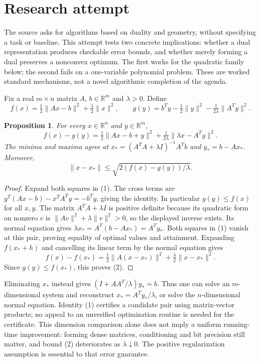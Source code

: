 \documentclass[11pt]{article}
\newtheorem{proposition}{Proposition}
\begin{document}
\section{Research attempt}
The source asks for algorithms based on duality and geometry, without specifying a task or baseline. This attempt tests two concrete implications: whether a dual representation produces checkable error bounds, and whether merely forming a dual preserves a nonconvex optimum. The first works for the quadratic family below; the second fails on a one-variable polynomial problem. These are worked standard mechanisms, not a novel algorithmic completion of the agenda.

Fix a real $m\times n$ matrix $A$, $b\in\mathbb R^m$ and $\lambda>0$. Define
\[
 f(x)=\tfrac12\|Ax-b\|^2+\tfrac\lambda2\|x\|^2,
 \qquad
 g(y)=b^Ty-\tfrac12\|y\|^2-\tfrac1{2\lambda}\|A^Ty\|^2.
\]

\begin{proposition}
For every $x\in\mathbb R^n$ and $y\in\mathbb R^m$,
\[
 f(x)-g(y)=\tfrac12\|Ax-b+y\|^2+
               \tfrac1{2\lambda}\|\lambda x-A^Ty\|^2. \tag{1}
\]
The minima and maxima agree at $x_*=(A^TA+\lambda I)^{-1}A^Tb$ and $y_*=b-Ax_*$. Moreover,
\[
 \|x-x_*\|\le\sqrt{2(f(x)-g(y))/\lambda}. \tag{2}
\]
\end{proposition}
\begin{proof}
Expand both squares in (1). The cross terms are $y^T(Ax-b)-x^TA^Ty=-b^Ty$, giving the identity. In particular $g(y)\le f(x)$ for all $x,y$. The matrix $A^TA+\lambda I$ is positive definite because its quadratic form on nonzero $v$ is $\|Av\|^2+\lambda\|v\|^2>0$, so the displayed inverse exists. Its normal equation gives $\lambda x_*=A^T(b-Ax_*)=A^Ty_*$. Both squares in (1) vanish at this pair, proving equality of optimal values and attainment. Expanding $f(x_*+h)$ and cancelling its linear term by the normal equation gives
\[
 f(x)-f(x_*)=\tfrac12\|A(x-x_*)\|^2+\tfrac\lambda2\|x-x_*\|^2.
\]
Since $g(y)\le f(x_*)$, this proves (2).
\end{proof}

Eliminating $x_*$ instead gives $(I+AA^T/\lambda)y_*=b$. Thus one can solve an $m$-dimensional system and reconstruct $x_*=A^Ty_*/\lambda$, or solve the $n$-dimensional normal equation. Identity (1) certifies a candidate pair using matrix-vector products; no appeal to an unverified optimization routine is needed for the certificate. This dimension comparison alone does not imply a uniform running-time improvement: forming dense matrices, conditioning and bit precision still matter, and bound (2) deteriorates as $\lambda\downarrow0$. The positive regularization assumption is essential to that error guarantee.
\end{document}
